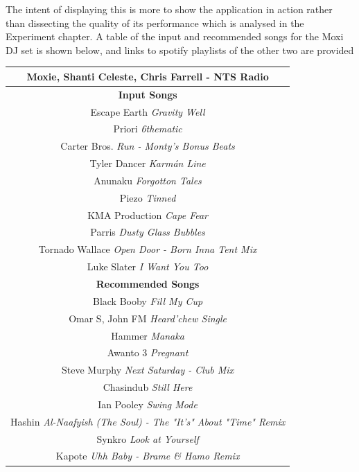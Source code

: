 The intent of displaying this is more to show the application in action rather than dissecting the quality of its performance which is analysed in the Experiment chapter. A table of the input and recommended songs for the Moxi DJ set is shown below, and links to spotify playlists of the other two are provided

\begin{center}
	\begin{tabular}{ |c|} 
		\hline
		\textbf{Moxie, Shanti Celeste, Chris Farrell - NTS Radio}\\ 
		\hline \textbf{Input Songs}\\ 
		\hline Escape Earth \textit{Gravity Well} \\ 
		\hline Priori \textit{6thematic }\\
		\hline Carter Bros. \textit{Run - Monty's Bonus Beats}\\
		\hline Tyler Dancer \textit{Karmán Line}\\ 
		\hline Anunaku \textit{Forgotton Tales}\\
		\hline Piezo \textit{Tinned}\\
		\hline KMA Production \textit{Cape Fear}\\
		\hline Parris \textit{Dusty Glass Bubbles}\\
		\hline Tornado Wallace \textit{Open Door - Born Inna Tent Mix}\\
		\hline Luke Slater \textit{I Want You Too}\\
		\hline \textbf{Recommended Songs}\\ 
		\hline Black Booby \textit{Fill My Cup}\\
		\hline Omar S, John FM \textit{Heard'chew Single}\\
		\hline Hammer \textit{Manaka}\\
		\hline Awanto 3 \textit{Pregnant}\\
		\hline Steve Murphy \textit{Next Saturday - Club Mix}\\
		\hline Chasindub \textit{Still Here}\\
		\hline Ian Pooley \textit{Swing Mode}\\
		\hline Hashin \textit{Al-Naafyish (The Soul) - The "It's" About "Time" Remix}\\
		\hline Synkro \textit{Look at Yourself}\\
		\hline Kapote \textit{Uhh Baby - Brame \& Hamo Remix}\\
		\hline
	\end{tabular}
\end{center}

